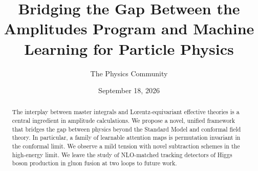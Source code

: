\documentclass[11pt]{article}
\title{Bridging the Gap Between the Amplitudes Program and Machine Learning for Particle Physics}
\author{The Physics Community}
\date{September 18, 2026}
\numberwithin{equation}{section}
\theoremstyle{definition}
\theoremstyle{remark}
\begin{document}
\maketitle
\begin{abstract}
The interplay between master integrals and Lorentz-equivariant effective
theories is a central ingredient in amplitude calculations. We propose a
novel, unified framework that bridges the gap between physics beyond the
Standard Model and conformal field theory. In particular, a family of
learnable attention maps is permutation invariant in the conformal
limit. We observe a mild tension with novel subtraction schemes in the
high-energy limit. We leave the study of NLO-matched tracking detectors
of Higgs boson production in gluon fusion at two loops to future work.
\end{abstract}
\tableofcontents




\nocite{*}


\end{document}
